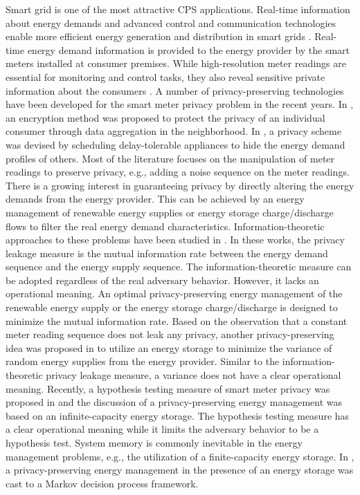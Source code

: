 Smart grid is one of the most attractive CPS applications. Real-time information about energy demands and advanced control and communication technologies enable more efficient energy generation and distribution in smart grids \cite{tan2013}. Real-time energy demand information is provided to the energy provider by the smart meters installed at consumer premises. While high-resolution meter readings are essential for monitoring and control tasks, they also reveal sensitive private information about the consumers \cite{sultanem1991,andres2010}. A number of privacy-preserving technologies have been developed for the smart meter privacy problem in the recent years. In \cite{fenjun2010}, an encryption method was proposed to protect the privacy of an individual consumer through data aggregation in the neighborhood. In \cite{kalogridis2010}, a privacy scheme was devised by scheduling delay-tolerable appliances to hide the energy demand profiles of others. Most of the literature focuses on the manipulation of meter readings to preserve privacy, e.g., adding a noise sequence on the meter readings. There is a growing interest in guaranteeing privacy by directly altering the energy demands from the energy provider. This can be achieved by an energy management of renewable energy supplies or energy storage charge/discharge flows to filter the real energy demand characteristics. Information-theoretic approaches to these problems have been studied in \cite{tan2013,varodayan2011,gunduz2013,giulio2015}. In these works, the privacy leakage measure is the mutual information rate between the energy demand sequence and the energy supply sequence. The information-theoretic measure can be adopted regardless of the real adversary behavior. However, it lacks an operational meaning. An optimal privacy-preserving energy management of the renewable energy supply or the energy storage charge/discharge is designed to minimize the mutual information rate. Based on the observation that a constant meter reading sequence does not leak any privacy, another privacy-preserving idea was proposed in \cite{lei2014} to utilize an energy storage to minimize the variance of random energy supplies from the energy provider. Similar to the information-theoretic privacy leakage measure, a variance does not have a clear operational meaning. Recently, a hypothesis testing measure of smart meter privacy was proposed in \cite{zuxing20152} and the discussion of a privacy-preserving energy management was based on an infinite-capacity energy storage. The hypothesis testing measure has a clear operational meaning while it limits the adversary behavior to be a hypothesis test. System memory is commonly inevitable in the energy management problems, e.g., the utilization of a finite-capacity energy storage. In \cite{jiyun2013,jiyun2014,simon2015}, a privacy-preserving energy management in the presence of an energy storage was cast to a Markov decision process framework.

